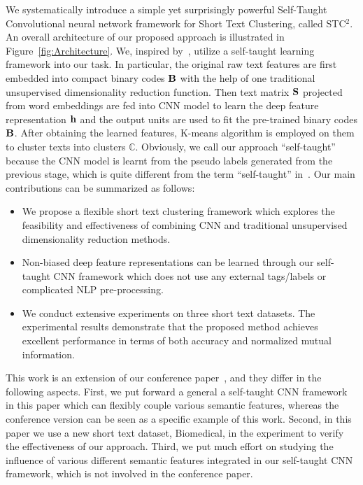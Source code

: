 \documentclass[review]{elsarticle}
\begin{document}
We systematically introduce a simple yet surprisingly powerful Self-Taught Convolutional neural network framework for Short Text Clustering, called STC$^2$. An overall architecture of our proposed approach is illustrated in Figure~\ref{fig:Architecture}. We, inspired by~\cite{28_zhang2010self,TwoStepHash_Lin_2013}, utilize a self-taught learning framework into our task. In particular, the original raw text features are first embedded into compact binary codes \({\bf{B}}\) with the help of one traditional unsupervised dimensionality reduction function. Then text matrix \({\bf{S}}\) projected from word embeddings are fed into CNN model to learn the deep feature representation \({\bf{h}}\) and the output units are used to fit the pre-trained binary codes \({\bf{B}}\). After obtaining the learned features, K-means algorithm is employed on them to cluster texts into clusters \(\mathbb{C}\). Obviously, we call our approach ``self-taught'' because the CNN model is learnt from the pseudo labels generated from the previous stage, which is quite different from the term ``self-taught'' in~\cite{raina2007self}.
Our main contributions can be summarized as follows:

\begin{itemize}
  \item We propose a flexible short text clustering framework which explores the feasibility and effectiveness of combining CNN and traditional unsupervised dimensionality reduction methods.
  \item Non-biased deep feature representations can be learned through our self-taught CNN framework which does not use any external tags/labels or complicated NLP pre-processing.
  \item We conduct extensive experiments on three short text datasets. The experimental results demonstrate that the proposed method achieves excellent performance in terms of both accuracy and normalized mutual information.
\end{itemize}

This work is an extension of our conference paper~\cite{xu2015short}, and they differ in the following aspects. First, we put forward a general a self-taught CNN framework in this paper which can flexibly couple various semantic features, whereas the conference version can be seen as a specific example of this work. Second, in this paper we use a new short text dataset, Biomedical, in the experiment to verify the effectiveness of our approach. Third, we put much effort on studying the influence of various different semantic features integrated in our self-taught CNN framework, which is not involved in the conference paper.
\end{document}
